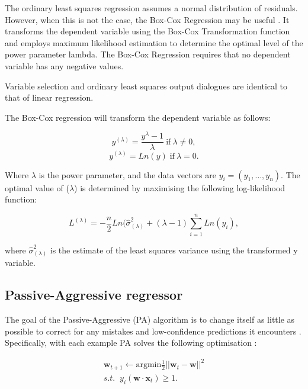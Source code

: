 The ordinary least squares regression assumes a normal distribution of residuals. However, when this is not the case, the Box-Cox Regression may be useful \cite{Box1964}. It transforms the dependent variable using the Box-Cox Transformation function and employs maximum likelihood estimation to determine the optimal level of the power parameter lambda. The Box-Cox Regression requires that no dependent variable has any negative values.

Variable selection and ordinary least squares output dialogues are identical to that of linear regression. 

The Box-Cox regression will transform the dependent variable as follows:

\begin{equation}
y^{(\lambda)} = \frac{y^{\lambda}-1}{\lambda}\:\text{if} \:\lambda\neq0,
\end{equation}
\begin{equation}
y^{(\lambda)} = Ln(y)\; \text{if}\: \lambda=0.
\end{equation}

\noindent Where $\lambda$ is the power parameter, and the data vectors are $y_i=(y_1,\ldots,y_n)$. The optimal value of ($\lambda$) is determined by maximising the following log-likelihood function:

\begin{equation}
L^{(\lambda)}=-\frac{n}{2}Ln(\hat{\sigma}^2_{(\lambda)}+(\lambda - 1)\sum_{i=1}^nLn(y_i),
\end{equation}

\noindent where $\hat{\sigma}^2_{(\lambda)}$ is the estimate of the least squares variance using the transformed y variable. 

\subsection{Passive-Aggressive regressor}

The goal of the Passive-Aggressive (PA) algorithm is to change itself as little as possible to correct for any mistakes and low-confidence predictions it encounters \cite{Gzik2014}. Specifically, with each example PA solves the following optimisation \cite{Ma2009}:

\begin{align}
\boldsymbol{w}_{t+1}\leftarrow \text{argmin} \frac{1}{2}\left|\left|{\boldsymbol{w}_t-\boldsymbol{w}}\right|\right|^2 \\
s.t. \; \; y_i(\boldsymbol{w}\cdot \boldsymbol{x}_t)\geq1.
\end{align}

